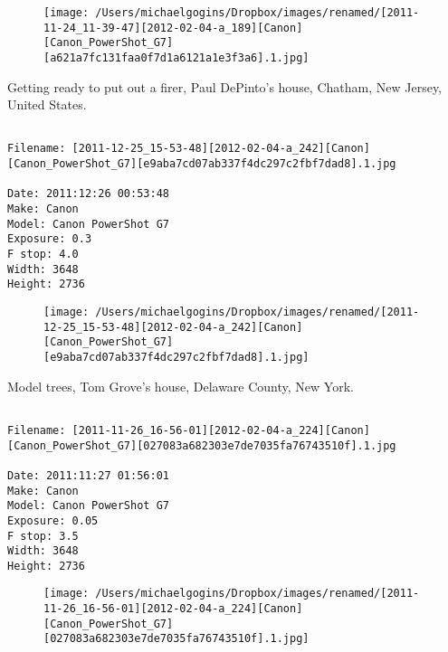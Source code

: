 \begin{figure}
\texttt{[image: /Users/michaelgogins/Dropbox/images/renamed/[2011-11-24\_11-39-47][2012-02-04-a\_189][Canon][Canon\_PowerShot\_G7][a621a7fc131faa0f7d1a6121a1e3f3a6].1.jpg]}
\end{figure}
    
\clearpage
\onecolumn
\noindent Getting ready to put out a firer, Paul DePinto's house, Chatham, New Jersey, United States.
\noindent
\begin{lstlisting}

Filename: [2011-12-25_15-53-48][2012-02-04-a_242][Canon][Canon_PowerShot_G7][e9aba7cd07ab337f4dc297c2fbf7dad8].1.jpg

Date: 2011:12:26 00:53:48
Make: Canon
Model: Canon PowerShot G7
Exposure: 0.3
F stop: 4.0
Width: 3648
Height: 2736
\end{lstlisting}
\clearpage

\begin{figure}
\texttt{[image: /Users/michaelgogins/Dropbox/images/renamed/[2011-12-25\_15-53-48][2012-02-04-a\_242][Canon][Canon\_PowerShot\_G7][e9aba7cd07ab337f4dc297c2fbf7dad8].1.jpg]}
\end{figure}
    
\clearpage
\onecolumn
\noindent Model trees, Tom Grove's house, Delaware County, New York.
\noindent
\begin{lstlisting}

Filename: [2011-11-26_16-56-01][2012-02-04-a_224][Canon][Canon_PowerShot_G7][027083a682303e7de7035fa76743510f].1.jpg

Date: 2011:11:27 01:56:01
Make: Canon
Model: Canon PowerShot G7
Exposure: 0.05
F stop: 3.5
Width: 3648
Height: 2736
\end{lstlisting}
\clearpage

\begin{figure}
\texttt{[image: /Users/michaelgogins/Dropbox/images/renamed/[2011-11-26\_16-56-01][2012-02-04-a\_224][Canon][Canon\_PowerShot\_G7][027083a682303e7de7035fa76743510f].1.jpg]}
\end{figure}
    
